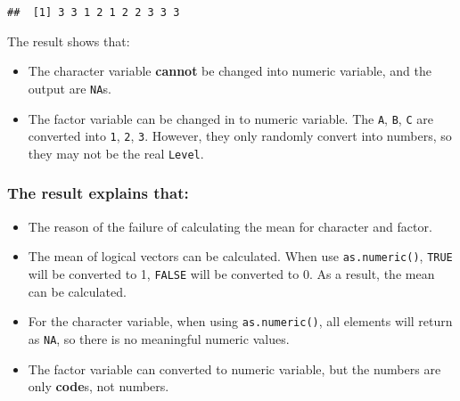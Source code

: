 \documentclass[
]{article}
\providecommand{\tightlist}{%
  \setlength{\itemsep}{0pt}\setlength{\parskip}{0pt}}
\begin{document}
\begin{verbatim}
##  [1] 3 3 1 2 1 2 2 3 3 3
\end{verbatim}

The result shows that:

\begin{itemize}
\tightlist
\item
  The character variable \textbf{cannot} be changed into numeric
  variable, and the output are \texttt{NA}s.
\item
  The factor variable can be changed in to numeric variable. The
  \texttt{A}, \texttt{B}, \texttt{C} are converted into \texttt{1},
  \texttt{2}, \texttt{3}. However, they only randomly convert into
  numbers, so they may not be the real \texttt{Level}.
\end{itemize}

\subsubsection{The result explains
that:}\label{the-result-explains-that}

\begin{itemize}
\tightlist
\item
  The reason of the failure of calculating the mean for character and
  factor.
\item
  The mean of logical vectors can be calculated. When use
  \texttt{as.numeric()}, \texttt{TRUE} will be converted to 1,
  \texttt{FALSE} will be converted to 0. As a result, the mean can be
  calculated.
\item
  For the character variable, when using \texttt{as.numeric()}, all
  elements will return as \texttt{NA}, so there is no meaningful numeric
  values.
\item
  The factor variable can converted to numeric variable, but the numbers
  are only \textbf{code}s, not numbers.
\end{itemize}
\end{document}
